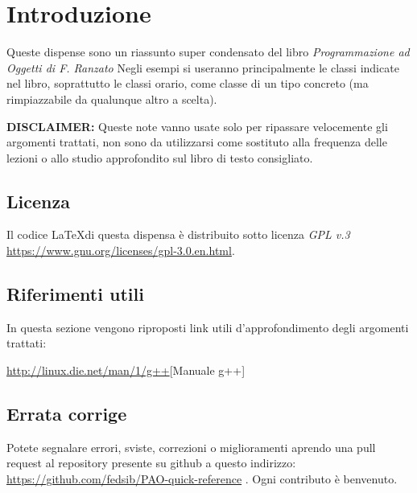 \chapter{Introduzione}
Queste dispense sono un riassunto super condensato del libro \textit{Programmazione ad Oggetti di F. Ranzato}
Negli esempi si useranno principalmente le classi indicate nel libro, soprattutto le classi orario, come classe di un tipo concreto (ma rimpiazzabile da qualunque altro a scelta). 

\textbf{DISCLAIMER:} Queste note vanno usate solo per ripassare velocemente gli argomenti trattati, non sono da utilizzarsi come sostituto alla frequenza delle lezioni o allo studio approfondito sul libro di testo consigliato.

\section{Licenza}
Il codice \LaTeX di questa dispensa è distribuito sotto licenza \textit{GPL v.3} \url{https://www.gnu.org/licenses/gpl-3.0.en.html}.


\section{Riferimenti utili}
In questa sezione vengono riproposti link utili d'approfondimento degli argomenti trattati:

\url{http://linux.die.net/man/1/g++}[Manuale g++]

\section{Errata corrige}

Potete segnalare errori, sviste, correzioni o miglioramenti aprendo una pull request al repository presente su github a questo indirizzo:
\url{https://github.com/fedsib/PAO-quick-reference} . Ogni contributo è benvenuto.